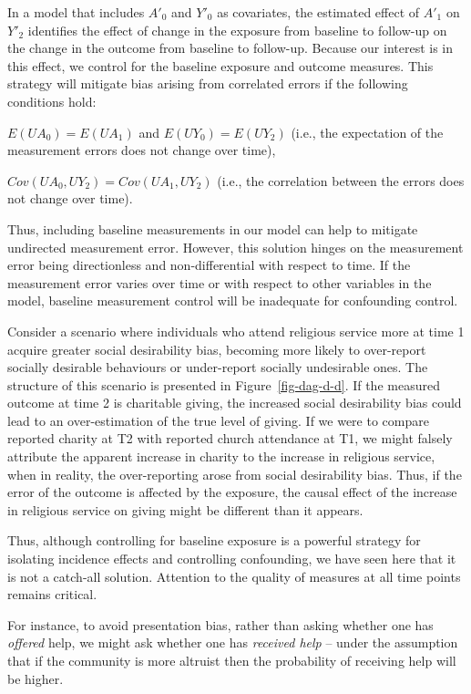 \documentclass[
  singlecolumn]{report}
\begin{document}
In a model that includes \(A'_0\) and \(Y'_0\) as covariates, the
estimated effect of \(A'_1\) on \(Y'_2\) identifies the effect of change
in the exposure from baseline to follow-up on the change in the outcome
from baseline to follow-up. Because our interest is in this effect, we
control for the baseline exposure and outcome measures. This strategy
will mitigate bias arising from correlated errors if the following
conditions hold:

\(E(UA_0) = E(UA_1)\) and \(E(UY_0) = E(UY_2)\) (i.e., the expectation
of the measurement errors does not change over time),

\(Cov(UA_0, UY_2) = Cov(UA_1, UY_2)\) (i.e., the correlation between the
errors does not change over time).

Thus, including baseline measurements in our model can help to mitigate
undirected measurement error. However, this solution hinges on the
measurement error being directionless and non-differential with respect
to time. If the measurement error varies over time or with respect to
other variables in the model, baseline measurement control will be
inadequate for confounding control.

Consider a scenario where individuals who attend religious service more
at time 1 acquire greater social desirability bias, becoming more likely
to over-report socially desirable behaviours or under-report socially
undesirable ones. The structure of this scenario is presented in
Figure~\ref{fig-dag-d-d}. If the measured outcome at time 2 is
charitable giving, the increased social desirability bias could lead to
an over-estimation of the true level of giving. If we were to compare
reported charity at T2 with reported church attendance at T1, we might
falsely attribute the apparent increase in charity to the increase in
religious service, when in reality, the over-reporting arose from social
desirability bias. Thus, if the error of the outcome is affected by the
exposure, the causal effect of the increase in religious service on
giving might be different than it appears.

Thus, although controlling for baseline exposure is a powerful strategy
for isolating incidence effects and controlling confounding, we have
seen here that it is not a catch-all solution. Attention to the quality
of measures at all time points remains critical.

For instance, to avoid presentation bias, rather than asking whether one
has \emph{offered} help, we might ask whether one has \emph{received
help} -- under the assumption that if the community is more altruist
then the probability of receiving help will be higher.
\end{document}
